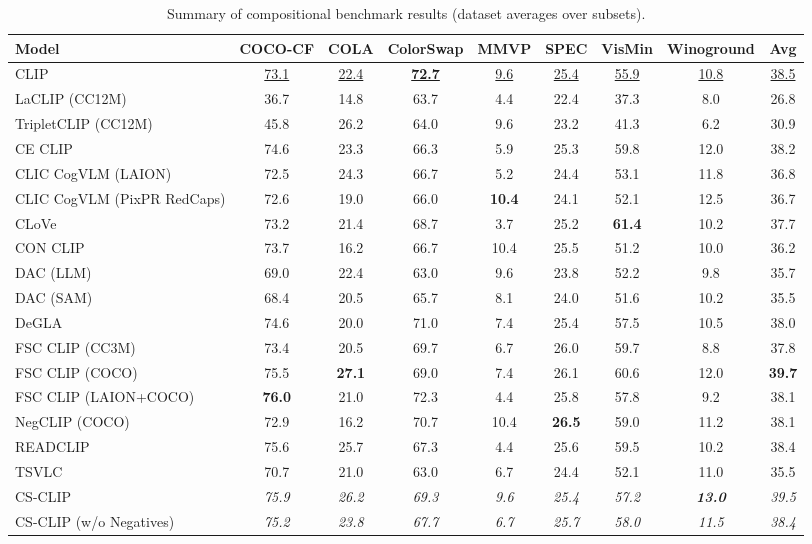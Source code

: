 \begin{table}[t]
  \centering
  \scriptsize
  \caption{Summary of compositional benchmark results (dataset averages over subsets).}
  \label{tab:summary_compositional}
  \begin{adjustbox}{max width=\textwidth}
  \setlength{\tabcolsep}{2pt}
  \begin{tabular}{lcccccccc}
    \toprule
    Model & COCO-CF & COLA & ColorSwap & MMVP & SPEC & VisMin & Winoground & Avg \\
    \midrule
    CLIP & \underline{73.1} & \underline{22.4} & \underline{\textbf{72.7}} & \underline{9.6} & \underline{25.4} & \underline{55.9} & \underline{10.8} & \underline{38.5} \\
    \midrule
    LaCLIP (CC12M) & 36.7 & 14.8 & 63.7 & 4.4 & 22.4 & 37.3 & 8.0 & 26.8 \\
    TripletCLIP (CC12M) & 45.8 & 26.2 & 64.0 & 9.6 & 23.2 & 41.3 & 6.2 & 30.9 \\
    \midrule
    CE CLIP & 74.6 & 23.3 & 66.3 & 5.9 & 25.3 & 59.8 & 12.0 & 38.2 \\
    CLIC CogVLM (LAION) & 72.5 & 24.3 & 66.7 & 5.2 & 24.4 & 53.1 & 11.8 & 36.8 \\
    CLIC CogVLM (PixPR RedCaps) & 72.6 & 19.0 & 66.0 & \textbf{10.4} & 24.1 & 52.1 & 12.5 & 36.7 \\
    CLoVe & 73.2 & 21.4 & 68.7 & 3.7 & 25.2 & \textbf{61.4} & 10.2 & 37.7 \\
    CON CLIP & 73.7 & 16.2 & 66.7 & 10.4 & 25.5 & 51.2 & 10.0 & 36.2 \\
    DAC (LLM) & 69.0 & 22.4 & 63.0 & 9.6 & 23.8 & 52.2 & 9.8 & 35.7 \\
    DAC (SAM) & 68.4 & 20.5 & 65.7 & 8.1 & 24.0 & 51.6 & 10.2 & 35.5 \\
    DeGLA & 74.6 & 20.0 & 71.0 & 7.4 & 25.4 & 57.5 & 10.5 & 38.0 \\
    FSC CLIP (CC3M) & 73.4 & 20.5 & 69.7 & 6.7 & 26.0 & 59.7 & 8.8 & 37.8 \\
    FSC CLIP (COCO) & 75.5 & \textbf{27.1} & 69.0 & 7.4 & 26.1 & 60.6 & 12.0 & \textbf{39.7} \\
    FSC CLIP (LAION+COCO) & \textbf{76.0} & 21.0 & 72.3 & 4.4 & 25.8 & 57.8 & 9.2 & 38.1 \\
    NegCLIP (COCO) & 72.9 & 16.2 & 70.7 & 10.4 & \textbf{26.5} & 59.0 & 11.2 & 38.1 \\
    READCLIP & 75.6 & 25.7 & 67.3 & 4.4 & 25.6 & 59.5 & 10.2 & 38.4 \\
    TSVLC & 70.7 & 21.0 & 63.0 & 6.7 & 24.4 & 52.1 & 11.0 & 35.5 \\
    \midrule
    CS-CLIP & \emph{75.9} & \emph{26.2} & \emph{69.3} & \emph{9.6} & \emph{25.4} & \emph{57.2} & \emph{\textbf{13.0}} & \emph{39.5} \\
    CS-CLIP (w/o Negatives) & \emph{75.2} & \emph{23.8} & \emph{67.7} & \emph{6.7} & \emph{25.7} & \emph{58.0} & \emph{11.5} & \emph{38.4} \\
    \bottomrule
  \end{tabular}
  \end{adjustbox}
\end{table}

